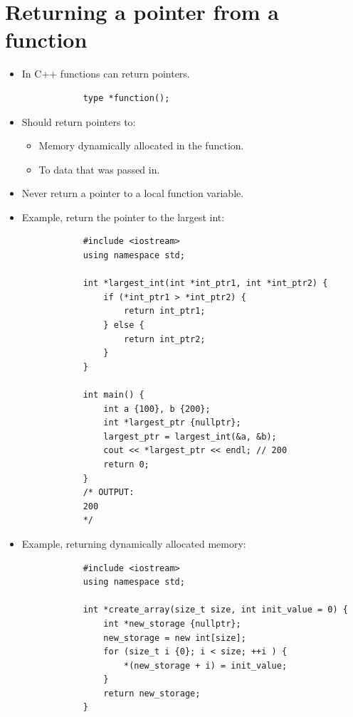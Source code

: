 \section{Returning a pointer from a function}
\begin{itemize}
    \item In C++ functions can return pointers.
        \begin{verbatim}
            type *function();
        \end{verbatim}

    \item Should return pointers to:
        \begin{itemize}
            \item Memory dynamically allocated in the function.
            \item To data that was passed in.
        \end{itemize}
    
    \item Never return a pointer to a local function variable.
    
    \item Example, return the pointer to the largest int:
        \begin{verbatim}
            #include <iostream>
            using namespace std;

            int *largest_int(int *int_ptr1, int *int_ptr2) {
                if (*int_ptr1 > *int_ptr2) {
                    return int_ptr1;
                } else {
                    return int_ptr2;
                }
            }

            int main() {
                int a {100}, b {200};
                int *largest_ptr {nullptr};
                largest_ptr = largest_int(&a, &b);
                cout << *largest_ptr << endl; // 200
                return 0;
            }
            /* OUTPUT:
            200
            */
        \end{verbatim}
    
    \item Example, returning dynamically allocated memory:
        \begin{verbatim}
            #include <iostream>
            using namespace std;

            int *create_array(size_t size, int init_value = 0) {
                int *new_storage {nullptr};
                new_storage = new int[size];
                for (size_t i {0}; i < size; ++i ) {
                    *(new_storage + i) = init_value;
                }
                return new_storage;
            }


\end{verbatim}
\end{itemize}
